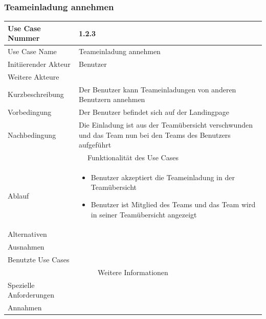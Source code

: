 \documentclass[10pt,a4paper]{article}
\begin{document}
		\subsubsection{Teameinladung annehmen}		
		\begin{tabular}{|l|p{.5\linewidth}|}
			\hline Use Case Nummer & 1.2.3 \\ 
			\hline Use Case Name & Teameinladung annehmen \\ 
			\hline Initiierender Akteur & Benutzer \\
			\hline Weitere Akteure & \\
			\hline Kurzbeschreibung & Der Benutzer kann Teameinladungen von anderen Benutzern annehmen \\
			\hline Vorbedingung & Der Benutzer befindet sich auf der Landingpage \\
			\hline Nachbedingung & Die Einladung ist aus der Teamübersicht verschwunden und das Team nun bei den Teams des Benutzers aufgeführt \\
			\hline \multicolumn{2}{|c|}{Funktionalität des Use Cases}\\
			\hline Ablauf & \begin{itemize}
				\item Benutzer akzeptiert die Teameinladung in der Teamübersicht
				\item Benutzer ist Mitglied des Teams und das Team wird in seiner Teamübersicht angezeigt
			\end{itemize} \\
			\hline Alternativen & \\
			\hline Ausnahmen & \\
			\hline Benutzte Use Cases & \\
			\hline \multicolumn{2}{|c|}{Weitere Informationen} \\
			\hline Spezielle Anforderungen & \\
			\hline Annahmen & \\
			\hline
		\end{tabular}
			
\end{document}
